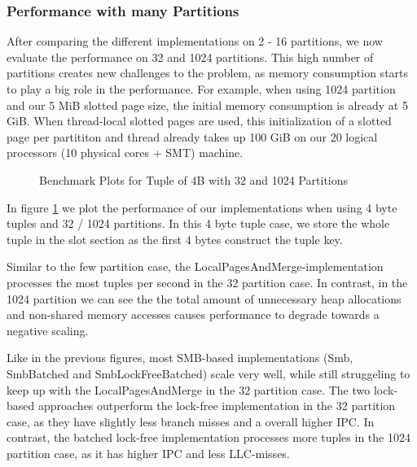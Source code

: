 \subsubsection{Performance with many Partitions}
After comparing the different implementations on 2 - 16 partitions, we now evaluate the performance on 32 and 1024 partitions.
This high number of partitions creates new challenges to the problem, as memory consumption starts to play a big role in the performance.
For example, when using 1024 partition and our 5 MiB slotted page size, the initial memory consumption is already at 5 GiB.
When thread-local slotted pages are used, this initialization of a slotted page per partititon and thread already takes up 100 GiB on our 20 logical processors (10 physical cores + SMT) machine.

\begin{figure}[h]
  \centering
  \begin{subfigure}{.49\textwidth}
    \centering
    \resizebox{\linewidth}{!}{}
  \end{subfigure}
  \begin{subfigure}{.49\textwidth}
    \centering
    \resizebox{\linewidth}{!}{}
  \end{subfigure}
  \caption[Shuffle Benchmark Plots for Tuple of 4B with 32 and 1024 Partitions]{Benchmark Plots for Tuple of 4B with 32 and 1024 Partitions}
  \label{plot-shuffle-4B-32-1024}
\end{figure}

In figure \ref{plot-shuffle-4B-32-1024} we plot the performance of our implementations when using 4 byte tuples and 32 / 1024 partitions.
In this 4 byte tuple case, we store the whole tuple in the slot section as the first 4 bytes construct the tuple key.

Similar to the few partition case, the LocalPagesAndMerge-implementation processes the most tuples per second in the 32 partition case.
In contrast, in the 1024 partition we can see the the total amount of unnecessary heap allocations and non-shared memory accesses causes performance to degrade towards a negative scaling.

Like in the previous figures, most \ac{SMB}-based implementations (Smb, SmbBatched and SmbLockFreeBatched) scale very well, while still struggeling to keep up with the LocalPagesAndMerge in the 32 partition case.
The two lock-based approaches outperform the lock-free implementation in the 32 partition case, as they have slightly less branch misses and a overall higher \ac{IPC}.
In contrast, the batched lock-free implementation processes more tuples in the 1024 partition case, as it has higher \ac{IPC} and less \ac{LLC}-misses.


